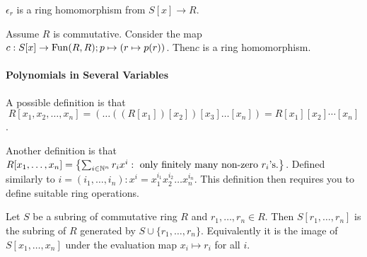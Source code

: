 \begin{proposition}
    \(\epsilon_r\) is a ring homomorphism from \(S[x] \to R\).
\end{proposition}

\begin{corollary}
    Assume \(R\) is commutative. Consider the map \(c: S[x] \to \operatorname{Fun}(R, R); p \mapsto (r \mapsto p(r))\). Then\(c\) is a ring homomorphism.
\end{corollary}


\paragraph{Polynomials in Several Variables}
A possible definition is that \[R[x_1, x_2, \dots, x_n] = (\dots ((R[x_1])[x_2])[x_3] \dots [x_n]) = R[x_1][x_2] \cdots[x_n]\].

Another definition is that \(R[x_1, \dots, x_n] = \left\{ \sum_{i \in \mathbb{N}^n} r_i x^i : \text{ only finitely many non-zero } r_i\text{'s}. \right\}\). Defined similarly to \(i = (i_1, \dots, i_n) : x^i = x_1^{i_1} x_2^{i_2} \dots x_n^{i_n}\). This definition then requires you to define suitable ring operations.

\begin{prop-defn}
    Let \(S\) be a subring of commutative ring \(R\) and \(r_1, \dots, r_n \in R\). Then \(S[r_1, \dots, r_n]\) is the subring of \(R\) generated by \(S \cup \{r_1, \dots, r_n\}\). Equivalently it is the image of \(S[x_1, \dots, x_n]\) under the evaluation map \(x_i \mapsto r_i\) for all \(i\).
\end{prop-defn}



